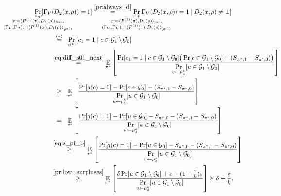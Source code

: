 \begin{align*}
\underset{
  \mathclap{
  \substack{\pi, \rho \\ x := \langle P^{(1)}(\pi), D_1(\rho) \rangle_{\trans}
    \\ (\Gamma_V, \Gamma_H) := \langle P^{(1)}(\pi), D_1 (\rho) \rangle_{P^{(1)}} }}}
{\Pr}[\Gamma_V&(D_2(x,\rho)) = 1]
  \overset{\eqref{pr:always_d}}{=}
\underset{
  \mathclap{
  \substack{\pi, \rho \\ x := \langle P^{(1)}(\pi), D_1(\rho) \rangle_{\trans}
    \\ (\Gamma_V, \Gamma_H) := \langle P^{(1)}(\pi), D_1 (\rho) \rangle_{P^{(1)}} }}}
{\Pr}[\Gamma_V(D_2(x,\rho)) = 1 \mid D_2(x,\rho) \neq \bot] \\
  &\overset{\hphantom{a}(*)\hphantom{a}}{=} \underset{\pi^{(k)}}{\Pr}[c_1 = 1 \mid c \in \cG_1 \setminus \cG_0] \\
  &\overset{\eqref{eq:diff_s01_next}}{=} \underset{\pi^*}{\mathbb{E}}
  \left[\frac{\Pr[c_1 = 1 \mid c \in \cG_1 \setminus \cG_0] \big(\Pr[c \in \cG_1 \setminus \cG_0] - (S_{\pi^*,1} - S_{\pi^*,0})\big)}
  {\underset{u \leftarrow \mu_{\delta}^{k}}{\Pr}[u \in \cG_1 \setminus \cG_0]}\right] \\
  &\overset{\hphantom{a(*)}\hphantom{a}}{\geq} \underset{\pi^*}{\mathbb{E}}
  \left[\frac{\Pr[g(c)=1] - \Pr[c \in \cG_0]  - (S_{\pi^*,1} - S_{\pi^*,0})}
  {\underset{u \leftarrow \mu_{\delta}^{k}}{\Pr}[u \in \cG_1 \setminus \cG_0]}\right] \\
  &\overset{\hphantom{a(*)}\hphantom{a}}{=} \underset{\pi^*}{\mathbb{E}}
  \left[\frac{\Pr[g(c)=1] - \Pr[u \in \cG_0] - S_{\pi^*,0}  - (S_{\pi^*,1} - S_{\pi^*,0})}
  {\underset{u \leftarrow \mu_{\delta}^{k}}{\Pr}[u \in \cG_1 \setminus \cG_0]}\right]\\
  &\overset{\eqref{eq:s_pi_b}}{\geq} \underset{\pi^*}{\mathbb{E}}
  \left[\frac{\Pr[g(c)=1] - \Pr[u \in \cG_0] - S_{\pi^*,0}  - (S_{\pi^*,1} - S_{\pi^*,0})}
  {\underset{u \leftarrow \mu_{\delta}^{k}}{\Pr}[u \in \cG_1 \setminus \cG_0]}\right]\\
  &\overset{\eqref{pr:low_surpluses}}{\geq} \underset{\pi^*}{\mathbb{E}}
  \left[\frac{\delta \Pr[u \in \cG_1 \setminus \cG_0] + \epsilon  - (1 - \frac{1}{k})\epsilon}
  {\underset{u \leftarrow \mu_{\delta}^{k}}{\Pr}[u \in \cG_1 \setminus \cG_0]}\right] \geq \delta + \frac{\epsilon}{k},

\end{align*}
